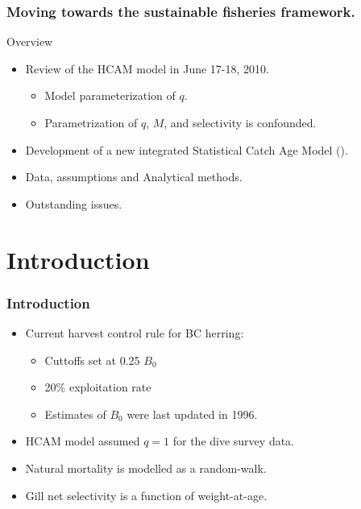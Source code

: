 

\begin{frame} %
	\frametitle{Moving towards the sustainable fisheries framework.} 
	\begin{block}
		{Overview} 
		\begin{itemize}
			\item Review of the HCAM model in June 17-18, 2010. 
			\begin{itemize}
				\item Model parameterization of $q$. 
				\item Parametrization of $q$, $M$, and selectivity is confounded. 
			\end{itemize}
			\item Development of a new integrated Statistical Catch Age Model (\iscam). 
			\item Data, assumptions and Analytical methods. 
			\item Outstanding issues. 
		\end{itemize}
	\end{block}
\end{frame}




\section{Introduction} %
\label{sec:introduction}

%
\begin{frame}
	\frametitle{Introduction} 
	\begin{itemize}
		\item Current harvest control rule for BC herring: 
		\begin{itemize}
			\item Cuttoffs set at 0.25 $B_0$ 
			\item 20\% exploitation rate 
			\item Estimates of $B_0$ were last updated in 1996. 
		\end{itemize}
		\item HCAM model assumed $q=1$ for the dive survey data. 
		\item Natural mortality is modelled as a random-walk. 
		\item Gill net selectivity is a function of weight-at-age. 
	\end{itemize}
\end{frame}

